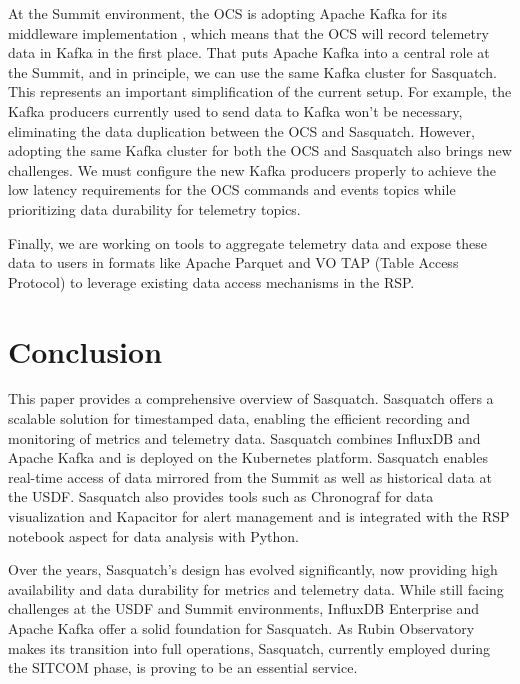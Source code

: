 At the Summit environment, the OCS is adopting Apache Kafka for its middleware implementation \cite{2024SPIE13101.59Ftmp, TSTN-033}, which means that the OCS will record telemetry data in Kafka in the first place. That puts Apache Kafka into a central role at the Summit, and in principle, we can use the same Kafka cluster for Sasquatch. This represents an important simplification of the current setup. For example, the Kafka producers currently used to send data to Kafka won't be necessary, eliminating the data duplication between the OCS and Sasquatch. However, adopting the same Kafka cluster for both the OCS and Sasquatch also brings new challenges. We must configure the new Kafka producers properly to achieve the low latency requirements for the OCS commands and events topics while prioritizing data durability for telemetry topics.

Finally, we are working on tools to aggregate telemetry \cite{SQR-058} data and expose these data to users in formats like Apache Parquet and VO TAP (Table Access Protocol)\cite{2019ivoa.spec.0927D} to leverage existing data access mechanisms in the RSP.

\section{Conclusion}
\label{sec:conc}

This paper provides a comprehensive overview of Sasquatch. Sasquatch offers a scalable solution for timestamped data, enabling the efficient recording and monitoring of metrics and telemetry data. Sasquatch combines InfluxDB and Apache Kafka and is deployed on the Kubernetes platform. Sasquatch enables real-time access of data mirrored from the Summit as well as historical data at the USDF. Sasquatch also provides tools such as Chronograf for data visualization and Kapacitor for alert management and is integrated with the RSP notebook aspect for data analysis with Python.

Over the years, Sasquatch's design has evolved significantly, now providing high availability and data durability for metrics and telemetry data. While still facing challenges at the USDF and Summit environments, InfluxDB Enterprise and Apache Kafka offer a solid foundation for Sasquatch. As Rubin Observatory makes its transition into full operations, Sasquatch, currently employed during the SITCOM phase, is proving to be an essential service.

\vskip 0.4in
